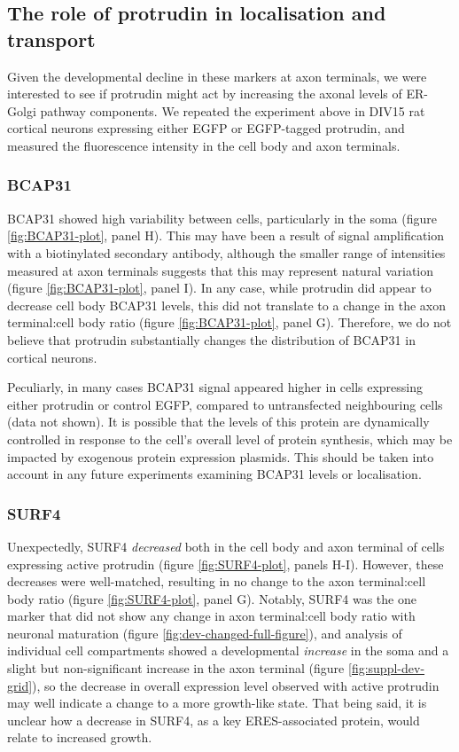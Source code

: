 \documentclass[
  12pt,
  a4paper,
]{book}
\begin{document}
\subsection{The role of protrudin in localisation and transport}\label{the-role-of-protrudin-in-localisation-and-transport}

Given the developmental decline in these markers at axon terminals, we were interested to see if protrudin might act by increasing the axonal levels of ER-Golgi pathway components. We repeated the experiment above in DIV15 rat cortical neurons expressing either EGFP or EGFP-tagged protrudin, and measured the fluorescence intensity in the cell body and axon terminals.

\subsubsection{BCAP31}\label{bcap31}

BCAP31 showed high variability between cells, particularly in the soma (figure \ref{fig:BCAP31-plot}, panel H). This may have been a result of signal amplification with a biotinylated secondary antibody, although the smaller range of intensities measured at axon terminals suggests that this may represent natural variation (figure \ref{fig:BCAP31-plot}, panel I). In any case, while protrudin did appear to decrease cell body BCAP31 levels, this did not translate to a change in the axon terminal:cell body ratio (figure \ref{fig:BCAP31-plot}, panel G). Therefore, we do not believe that protrudin substantially changes the distribution of BCAP31 in cortical neurons.

Peculiarly, in many cases BCAP31 signal appeared higher in cells expressing either protrudin or control EGFP, compared to untransfected neighbouring cells (data not shown). It is possible that the levels of this protein are dynamically controlled in response to the cell's overall level of protein synthesis, which may be impacted by exogenous protein expression plasmids. This should be taken into account in any future experiments examining BCAP31 levels or localisation.

\subsubsection{SURF4}\label{surf4}

Unexpectedly, SURF4 \emph{decreased} both in the cell body and axon terminal of cells expressing active protrudin (figure \ref{fig:SURF4-plot}, panels H-I). However, these decreases were well-matched, resulting in no change to the axon terminal:cell body ratio (figure \ref{fig:SURF4-plot}, panel G). Notably, SURF4 was the one marker that did not show any change in axon terminal:cell body ratio with neuronal maturation (figure \ref{fig:dev-changed-full-figure}), and analysis of individual cell compartments showed a developmental \emph{increase} in the soma and a slight but non-significant increase in the axon terminal (figure \ref{fig:suppl-dev-grid}), so the decrease in overall expression level observed with active protrudin may well indicate a change to a more growth-like state. That being said, it is unclear how a decrease in SURF4, as a key ERES-associated protein, would relate to increased growth.
\end{document}
